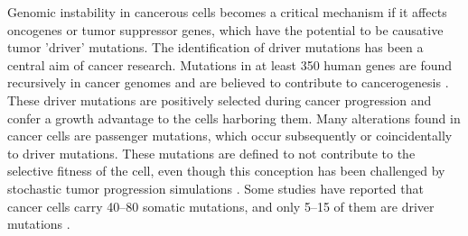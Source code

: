       Genomic instability in cancerous cells becomes a critical mechanism if it
      affects oncogenes or tumor suppressor genes, which have the potential to
      be causative tumor 'driver' mutations. The identification of driver
      mutations has been a central aim of cancer research. Mutations in at least
      350 human genes are found recursively in cancer genomes and are believed
      to contribute to cancerogenesis {\cite{cancer_genome}}. These driver
      mutations are positively selected during cancer progression and confer a
      growth advantage to the cells harboring them. Many alterations found in
      cancer cells are passenger mutations, which occur subsequently or
      coincidentally to driver mutations. These mutations are defined to not
      contribute to the selective fitness of the cell, even though this
      conception has been challenged by stochastic tumor progression simulations
      {\cite{stochastic_cancer}}. Some studies have reported that cancer cells
      carry 40--80 somatic mutations, and only 5--15 of them are driver
      mutations {\cite{som_mut}}.

